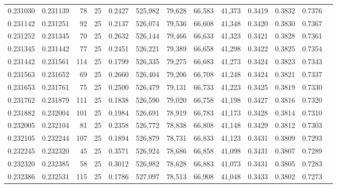 \begin{tabular}{rrrrrrrrrrrrr}
0.231030 & 0.231139 &    78 &  25 &                                     0.2427 & 525,982 &  79,628 &  66,583 &  41,373 & 0.3419 & 0.3832 & 0.7376 \\
0.231142 & 0.231251 &    92 &  25 &                                     0.2137 & 526,074 &  79,536 &  66,608 &  41,348 & 0.3420 & 0.3830 & 0.7367 \\
0.231252 & 0.231345 &    70 &  25 &                                     0.2632 & 526,144 &  79,466 &  66,633 &  41,323 & 0.3421 & 0.3828 & 0.7361 \\
0.231345 & 0.231442 &    77 &  25 &                                     0.2451 & 526,221 &  79,389 &  66,658 &  41,298 & 0.3422 & 0.3825 & 0.7354 \\
0.231442 & 0.231561 &   114 &  25 &                                     0.1799 & 526,335 &  79,275 &  66,683 &  41,273 & 0.3424 & 0.3823 & 0.7343 \\
0.231563 & 0.231652 &    69 &  25 &                                     0.2660 & 526,404 &  79,206 &  66,708 &  41,248 & 0.3424 & 0.3821 & 0.7337 \\
0.231653 & 0.231761 &    75 &  25 &                                     0.2500 & 526,479 &  79,131 &  66,733 &  41,223 & 0.3425 & 0.3819 & 0.7330 \\
0.231762 & 0.231879 &   111 &  25 &                                     0.1838 & 526,590 &  79,020 &  66,758 &  41,198 & 0.3427 & 0.3816 & 0.7320 \\
0.231882 & 0.232004 &   101 &  25 &                                     0.1984 & 526,691 &  78,919 &  66,783 &  41,173 & 0.3428 & 0.3814 & 0.7310 \\
0.232005 & 0.232104 &    81 &  25 &                                     0.2358 & 526,772 &  78,838 &  66,808 &  41,148 & 0.3429 & 0.3812 & 0.7303 \\
0.232105 & 0.232244 &   107 &  25 &                                     0.1894 & 526,879 &  78,731 &  66,833 &  41,123 & 0.3431 & 0.3809 & 0.7293 \\
0.232245 & 0.232320 &    45 &  25 &                                     0.3571 & 526,924 &  78,686 &  66,858 &  41,098 & 0.3431 & 0.3807 & 0.7289 \\
0.232320 & 0.232385 &    58 &  25 &                                     0.3012 & 526,982 &  78,628 &  66,883 &  41,073 & 0.3431 & 0.3805 & 0.7283 \\
0.232386 & 0.232531 &   115 &  25 &                                     0.1786 & 527,097 &  78,513 &  66,908 &  41,048 & 0.3433 & 0.3802 & 0.7273 \\

\end{tabular}
